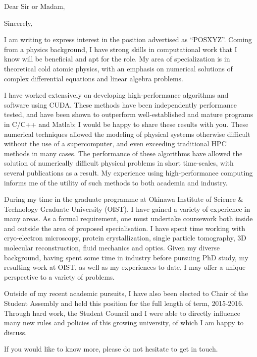 \documentclass[12pt,a4paper,unicode]{moderncv}
\begin{document}
    \date{\today} %
    \opening{Dear Sir or Madam,}
    \closing{Sincerely,}
    \makelettertitle
{
    I am writing to express interest in the position advertised as ``POSXYZ''. Coming from a physics background, I have strong skills in computational work that I know will be beneficial and apt for the role. My area of specialization is in theoretical cold atomic physics, with an emphasis on numerical solutions of complex differential equations and linear algebra problems.

    I have worked extensively on developing high-performance algorithms and software using CUDA. These methods have been independently performance tested, and have been shown to outperform well-established and mature programs in C/C++ and Matlab; I would be happy to share these results with you. These numerical techniques allowed the modeling of physical systems otherwise difficult without the use of a supercomputer, and even exceeding traditional HPC methods in many cases. The performance of these algorithms have allowed the solution of numerically difficult physical problems in short time-scales, with several publications as a result. My experience using high-performance computing informs me of the utility of such methods to both academia and industry.

    During my time in the graduate programme at Okinawa Institute of Science \& Technology Graduate University (OIST), I have gained a variety of experience in many areas. As a formal requirement, one must undertake coursework both inside and outside the area of proposed specialisation. I have spent time working with cryo-electron microscopy, protein crystallization, single particle tomography, 3D molecular reconstruction, fluid mechanics and optics. Given my diverse background, having spent some time in industry before pursuing PhD study, my resulting work at OIST, as well as my experiences to date, I may offer a unique perspective to a variety of problems.

    Outside of my recent academic pursuits, I have also been elected to Chair of the Student Assembly and held this position for the full length of term, 2015-2016. Through hard work, the Student Council and I were able to directly influence many new rules and policies of this growing university, of which I am happy to discuss.

If you would like to know more, please do not hesitate to get in touch.
}

\makeletterclosing
\end{document}
